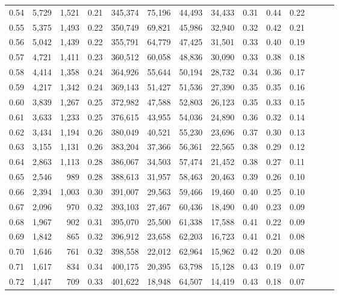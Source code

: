 \begin{tabular}{rrrrrrrrrrrrrr}
0.54 &  5,729 &  1,521 &  0.21 &  345,374 &   75,196 &  44,493 &  34,433 &  0.31 &  0.44 &      0.22 \\
0.55 &  5,375 &  1,493 &  0.22 &  350,749 &   69,821 &  45,986 &  32,940 &  0.32 &  0.42 &      0.21 \\
0.56 &  5,042 &  1,439 &  0.22 &  355,791 &   64,779 &  47,425 &  31,501 &  0.33 &  0.40 &      0.19 \\
0.57 &  4,721 &  1,411 &  0.23 &  360,512 &   60,058 &  48,836 &  30,090 &  0.33 &  0.38 &      0.18 \\
0.58 &  4,414 &  1,358 &  0.24 &  364,926 &   55,644 &  50,194 &  28,732 &  0.34 &  0.36 &      0.17 \\
0.59 &  4,217 &  1,342 &  0.24 &  369,143 &   51,427 &  51,536 &  27,390 &  0.35 &  0.35 &      0.16 \\
0.60 &  3,839 &  1,267 &  0.25 &  372,982 &   47,588 &  52,803 &  26,123 &  0.35 &  0.33 &      0.15 \\
0.61 &  3,633 &  1,233 &  0.25 &  376,615 &   43,955 &  54,036 &  24,890 &  0.36 &  0.32 &      0.14 \\
0.62 &  3,434 &  1,194 &  0.26 &  380,049 &   40,521 &  55,230 &  23,696 &  0.37 &  0.30 &      0.13 \\
0.63 &  3,155 &  1,131 &  0.26 &  383,204 &   37,366 &  56,361 &  22,565 &  0.38 &  0.29 &      0.12 \\
0.64 &  2,863 &  1,113 &  0.28 &  386,067 &   34,503 &  57,474 &  21,452 &  0.38 &  0.27 &      0.11 \\
0.65 &  2,546 &    989 &  0.28 &  388,613 &   31,957 &  58,463 &  20,463 &  0.39 &  0.26 &      0.10 \\
0.66 &  2,394 &  1,003 &  0.30 &  391,007 &   29,563 &  59,466 &  19,460 &  0.40 &  0.25 &      0.10 \\
0.67 &  2,096 &    970 &  0.32 &  393,103 &   27,467 &  60,436 &  18,490 &  0.40 &  0.23 &      0.09 \\
0.68 &  1,967 &    902 &  0.31 &  395,070 &   25,500 &  61,338 &  17,588 &  0.41 &  0.22 &      0.09 \\
0.69 &  1,842 &    865 &  0.32 &  396,912 &   23,658 &  62,203 &  16,723 &  0.41 &  0.21 &      0.08 \\
0.70 &  1,646 &    761 &  0.32 &  398,558 &   22,012 &  62,964 &  15,962 &  0.42 &  0.20 &      0.08 \\
0.71 &  1,617 &    834 &  0.34 &  400,175 &   20,395 &  63,798 &  15,128 &  0.43 &  0.19 &      0.07 \\
0.72 &  1,447 &    709 &  0.33 &  401,622 &   18,948 &  64,507 &  14,419 &  0.43 &  0.18 &      0.07 \\

\end{tabular}
